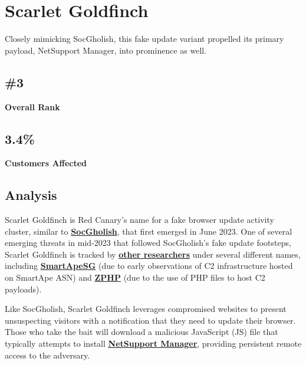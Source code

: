 
\section{\textbf{Scarlet Goldfinch}}

Closely mimicking SocGholish, this fake update variant propelled its primary payload, NetSupport Manager, into prominence as well.

\subsection{\textbf{\#3}}

\textbf{Overall Rank}

\subsection{\textbf{3.4\%}}

\textbf{Customers Affected}

\subsection{\textbf{Analysis}}

Scarlet Goldfinch is Red Canary’s name for a fake browser update activity cluster, similar to \href{https://redcanary.com/threat-detection-report/threats/socgholish/}{\textbf{SocGholish}}, that first emerged in June 2023. One of several emerging threats in mid-2023 that followed SocGholish’s fake update footsteps, Scarlet Goldfinch is tracked by \href{https://www.trellix.com/blogs/research/new-techniques-of-fake-browser-updates/}{\textbf{other researchers}} under several different names, including \href{https://medium.com/walmartglobaltech/smartapesg-4605157a5b80}{\textbf{SmartApeSG}} (due to early observations of C2 infrastructure hosted on SmartApe ASN) and \href{https://www.proofpoint.com/us/blog/threat-insight/are-you-sure-your-browser-date-current-landscape-fake-browser-updates}{\textbf{ZPHP}} (due to the use of PHP files to host C2 payloads).

Like SocGholish, Scarlet Goldfinch leverages compromised websites to present unsuspecting visitors with a notification that they need to update their browser. Those who take the bait will download a malicious JavaScript (JS) file that typically attempts to install \href{https://redcanary.com/threat-detection-report/threats/netsupport-manager/}{\textbf{NetSupport Manager}}, providing persistent remote access to the adversary.

